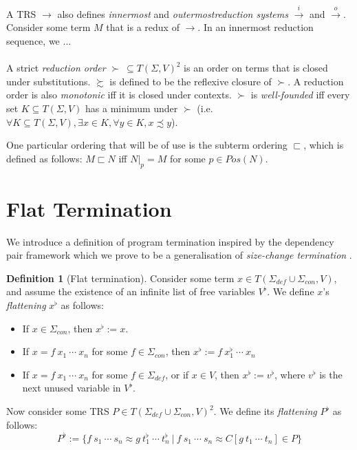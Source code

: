 \documentclass{article}
\theoremstyle{definition}
\newtheorem{definition}[theorem]{Definition}
\newcommand{\subterm}{\sqsubset}
\begin{document}
A TRS $\rightarrow$ also defines \emph{innermost} and \emph{outermostreduction systems} $\overset{i}{\rightarrow}$ and $\overset{o}{\rightarrow}$. Consider some term $M$ that is a redux of $\rightarrow$. In an innermost reduction sequence, we ...
\\~\\
A strict \emph{reduction order} $\succ ~ \subseteq T(\Sigma, V)^2$ is an order on terms that is closed under substitutions.  $\succsim$ is defined to be the reflexive closure of $\succ$. A reduction order is also \emph{monotonic} iff it is closed under contexts. $\succ$ is \emph{well-founded} iff every set $K \subseteq T(\Sigma, V)$ has a minimum under $\succ$ (i.e. $\forall K \subseteq T(\Sigma, V), \exists x \in K, \forall y \in K, x \precsim y$).

One particular ordering that will be of use is the subterm ordering $\subterm$, which is defined as follows: $M \subterm N$ iff $N|_p = M$ for some $p \in Pos(N)$.

\section{Flat Termination}

We introduce a definition of program termination inspired by the dependency pair framework which we prove to be a generalisation of \emph{size-change termination} \cite{lee2001sizechange,thiemann2005sizechange}.

\begin{definition}[Flat termination]
    Consider some term $x \in T(\Sigma_{def} \cup \Sigma_{con}, V)$, and assume the existence of an infinite list of free variables $V^\flat$. We define $x$'s \emph{flattening} $x^\flat$ as follows:
    \begin{itemize}
        \item If $x \in \Sigma_{con}$, then $x^\flat := x$.
        \item If $x = f ~ x_1 ~ \cdots ~ x_n$ for some $f \in \Sigma_{con}$, then $x^\flat := f ~ x^\flat_1 ~ \cdots ~ x_n$ 
        \item If $x = f ~ x_1 ~ \cdots ~ x_n$ for some $f \in \Sigma_{def}$, or if $x \in V$, then $x^\flat := v^\flat$, where $v^\flat$ is the next unused variable in $V^\flat$. 
    \end{itemize}
    Now consider some TRS $P \in T(\Sigma_{def} \cup \Sigma_{con}, V)^2$. We define its \emph{flattening} $P^\flat$ as follows:
    \begin{equation*}
        P^\flat := \{ f ~ s_1 ~ \cdots ~ s_n \approx g ~ t_1^\flat ~ \cdots ~ t_n^\flat ~|~ f ~ s_1 ~ \cdots ~ s_n \approx C[g ~ t_1 ~ \cdots ~ t_n] \in P \}
    \end{equation*}
\end{definition}
\end{document}
